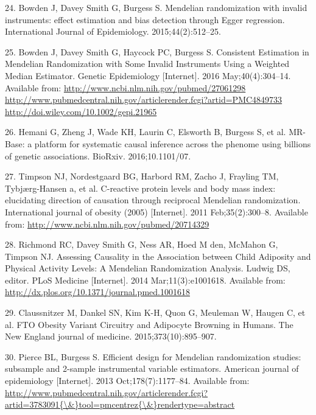 \documentclass[]{article}
\begin{document}
\hypertarget{ref-Bowden2015}{}
24. Bowden J, Davey Smith G, Burgess S. Mendelian randomization with
invalid instruments: effect estimation and bias detection through Egger
regression. International Journal of Epidemiology. 2015;44(2):512--25.

\hypertarget{ref-Bowden2016b}{}
25. Bowden J, Davey Smith G, Haycock PC, Burgess S. Consistent
Estimation in Mendelian Randomization with Some Invalid Instruments
Using a Weighted Median Estimator. Genetic Epidemiology {[}Internet{]}.
2016 May;40(4):304--14. Available from:
\href{http://www.ncbi.nlm.nih.gov/pubmed/27061298\%20http://www.pubmedcentral.nih.gov/articlerender.fcgi?artid=PMC4849733\%20http://doi.wiley.com/10.1002/gepi.21965}{http://www.ncbi.nlm.nih.gov/pubmed/27061298 http://www.pubmedcentral.nih.gov/articlerender.fcgi?artid=PMC4849733 http://doi.wiley.com/10.1002/gepi.21965}

\hypertarget{ref-Hemani2016}{}
26. Hemani G, Zheng J, Wade KH, Laurin C, Elsworth B, Burgess S, et al.
MR-Base: a platform for systematic causal inference across the phenome
using billions of genetic associations. BioRxiv. 2016;10.1101/07.

\hypertarget{ref-Timpson2011}{}
27. Timpson NJ, Nordestgaard BG, Harbord RM, Zacho J, Frayling TM,
Tybjærg-Hansen a, et al. C-reactive protein levels and body mass index:
elucidating direction of causation through reciprocal Mendelian
randomization. International journal of obesity (2005) {[}Internet{]}.
2011 Feb;35(2):300--8. Available from:
\url{http://www.ncbi.nlm.nih.gov/pubmed/20714329}

\hypertarget{ref-Richmond2014}{}
28. Richmond RC, Davey Smith G, Ness AR, Hoed M den, McMahon G, Timpson
NJ. Assessing Causality in the Association between Child Adiposity and
Physical Activity Levels: A Mendelian Randomization Analysis. Ludwig DS,
editor. PLoS Medicine {[}Internet{]}. 2014 Mar;11(3):e1001618. Available
from: \url{http://dx.plos.org/10.1371/journal.pmed.1001618}

\hypertarget{ref-Claussnitzer2015}{}
29. Claussnitzer M, Dankel SN, Kim K-H, Quon G, Meuleman W, Haugen C, et
al. FTO Obesity Variant Circuitry and Adipocyte Browning in Humans. The
New England journal of medicine. 2015;373(10):895--907.

\hypertarget{ref-Pierce2013}{}
30. Pierce BL, Burgess S. Efficient design for Mendelian randomization
studies: subsample and 2-sample instrumental variable estimators.
American journal of epidemiology {[}Internet{]}. 2013
Oct;178(7):1177--84. Available from:
\href{http://www.pubmedcentral.nih.gov/articlerender.fcgi?artid=3783091\%7B/\&\%7Dtool=pmcentrez\%7B/\&\%7Drendertype=abstract}{http://www.pubmedcentral.nih.gov/articlerender.fcgi?artid=3783091\{\textbackslash{}\&\}tool=pmcentrez\{\textbackslash{}\&\}rendertype=abstract}
\end{document}
